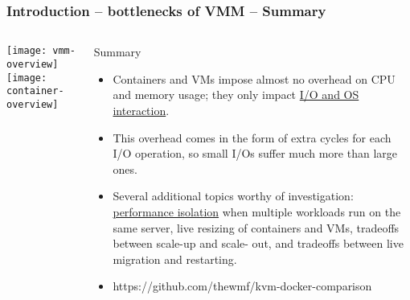\begin{frame}[plain]
	\frametitle{Introduction -- bottlenecks of VMM -- Summary}
	
	
	
	\begin{columns}
		
		\begin{column}{.4\textwidth}
			\centering
			\texttt{[image: vmm-overview]}
			\texttt{[image: container-overview]}
		\end{column}
		
		\begin{column}{.6\textwidth}
			
			Summary
			\begin{itemize}
				\item Containers and VMs impose almost
				no overhead on CPU and memory usage; they only impact
				\underline{I/O and OS interaction}. 
				\item This overhead comes in the form of
				extra cycles for each I/O operation, so small I/Os suffer much
				more than large ones. 
				\item Several additional topics worthy of investigation: 
				\underline{performance isolation}
				when multiple workloads run on the same server, live resizing
				of containers and VMs, tradeoffs between scale-up and scale-
				out, and tradeoffs between live migration and restarting.
				
				\item https://github.com/thewmf/kvm-docker-comparison
				
			\end{itemize}	
			
		\end{column}
		
		
	\end{columns}
	
	
\end{frame}
